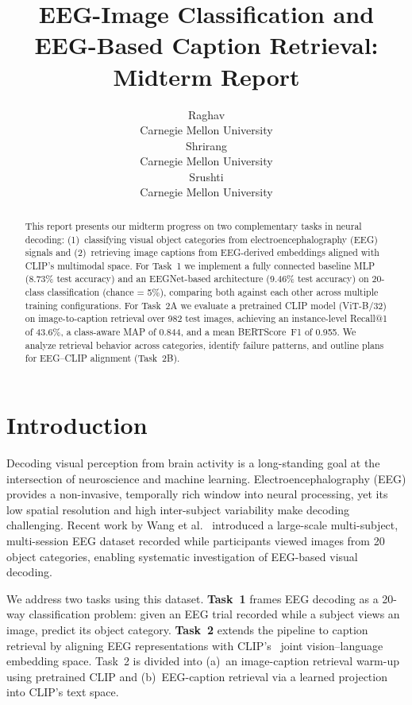 \documentclass{article}
\title{EEG-Image Classification and EEG-Based Caption Retrieval:\\Midterm Report}
\author{%
  Raghav \\
  Carnegie Mellon University\\
  \And
  Shrirang \\
  Carnegie Mellon University\\
  \And
  Srushti \\
  Carnegie Mellon University\\
}
\begin{document}
\maketitle

\begin{abstract}
This report presents our midterm progress on two complementary tasks in neural decoding: (1)~classifying visual object categories from electroencephalography (EEG) signals and (2)~retrieving image captions from EEG-derived embeddings aligned with CLIP's multimodal space. For Task~1 we implement a fully connected baseline MLP (8.73\% test accuracy) and an EEGNet-based architecture (9.46\% test accuracy) on 20-class classification (chance = 5\%), comparing both against each other across multiple training configurations. For Task~2A we evaluate a pretrained CLIP model (ViT-B/32) on image-to-caption retrieval over 982 test images, achieving an instance-level Recall@1 of 43.6\%, a class-aware MAP of 0.844, and a mean BERTScore~F1 of 0.955. We analyze retrieval behavior across categories, identify failure patterns, and outline plans for EEG--CLIP alignment (Task~2B).
\end{abstract}

\section{Introduction}
\label{sec:intro}

Decoding visual perception from brain activity is a long-standing goal at the intersection of neuroscience and machine learning. Electroencephalography (EEG) provides a non-invasive, temporally rich window into neural processing, yet its low spatial resolution and high inter-subject variability make decoding challenging. Recent work by Wang et al.~\cite{wang2025eeg} introduced a large-scale multi-subject, multi-session EEG dataset recorded while participants viewed images from 20 object categories, enabling systematic investigation of EEG-based visual decoding.

We address two tasks using this dataset. \textbf{Task~1} frames EEG decoding as a 20-way classification problem: given an EEG trial recorded while a subject views an image, predict its object category. \textbf{Task~2} extends the pipeline to caption retrieval by aligning EEG representations with CLIP's~\cite{radford2021clip} joint vision--language embedding space. Task~2 is divided into (a)~an image-caption retrieval warm-up using pretrained CLIP and (b)~EEG-caption retrieval via a learned projection into CLIP's text space.
\end{document}
